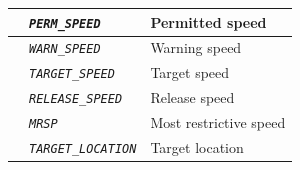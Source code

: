 \documentclass{template/openetcs}
\begin{document}
\begin{itemize}
\begin{longtable}{|l|l|l|}
			\hline
			
			&	\begin{minipage}[t]{0.40\linewidth} \emph{\texttt{PERM\_SPEED}} \end{minipage}
			&	\begin{minipage}[t]{0.38\linewidth}Permitted speed \end{minipage} \\
			
			\hline
			
			&	\begin{minipage}[t]{0.40\linewidth} \emph{\texttt{WARN\_SPEED}} \end{minipage}
			&	\begin{minipage}[t]{0.38\linewidth} Warning speed \end{minipage} \\
			
			\hline
			
			&	\begin{minipage}[t]{0.40\linewidth} \emph{\texttt{TARGET\_SPEED}} \end{minipage}
			&	\begin{minipage}[t]{0.38\linewidth} Target speed \end{minipage} \\
			
			\hline
			
			&	\begin{minipage}[t]{0.40\linewidth} \emph{\texttt{RELEASE\_SPEED}} \end{minipage}
			&	\begin{minipage}[t]{0.38\linewidth} Release speed \end{minipage} \\ 
			
			\hline					
			
			&	\begin{minipage}[t]{0.40\linewidth} \emph{\texttt{MRSP}} \end{minipage}
			&	\begin{minipage}[t]{0.38\linewidth} Most restrictive speed \end{minipage} \\
			
			\hline
			
			&	\begin{minipage}[t]{0.40\linewidth} \emph{\texttt{TARGET\_LOCATION}} \end{minipage}
			&	\begin{minipage}[t]{0.38\linewidth} Target location \end{minipage} \\
			

\end{longtable}
\end{itemize}
\end{document}

